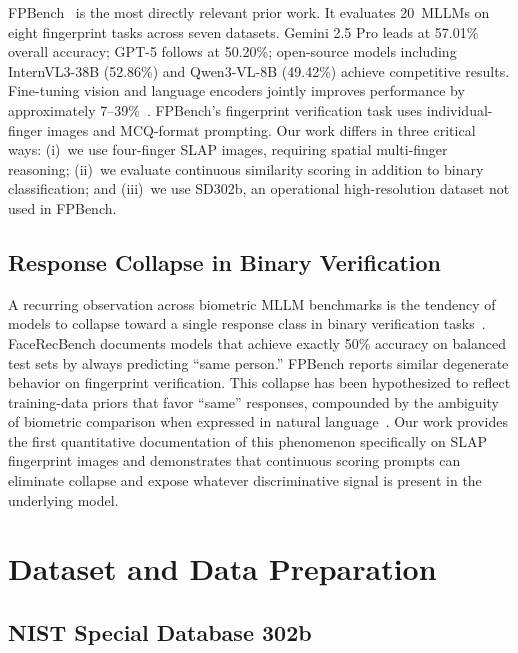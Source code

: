 \documentclass[journal]{IEEEtran}
\begin{document}
FPBench~\cite{fpbench2025} is the most directly relevant prior work.
It evaluates 20~MLLMs on eight fingerprint tasks across seven datasets.
Gemini 2.5 Pro leads at 57.01\% overall accuracy; GPT-5 follows at 50.20\%;
open-source models including InternVL3-38B (52.86\%) and Qwen3-VL-8B
(49.42\%) achieve competitive results.
Fine-tuning vision and language encoders jointly improves performance by
approximately 7--39\%~\cite{fpbench2025}.
FPBench's fingerprint verification task uses individual-finger images and
MCQ-format prompting.
Our work differs in three critical ways: (i)~we use four-finger SLAP images,
requiring spatial multi-finger reasoning; (ii)~we evaluate continuous
similarity scoring in addition to binary classification; and
(iii)~we use SD302b, an operational high-resolution dataset not used in
FPBench.

\subsection{Response Collapse in Binary Verification}

A recurring observation across biometric MLLM benchmarks is the tendency
of models to collapse toward a single response class in binary
verification tasks~\cite{facerecbench2025,fpbench2025}.
FaceRecBench documents models that achieve exactly 50\% accuracy on
balanced test sets by always predicting ``same person.''
FPBench reports similar degenerate behavior on fingerprint verification.
This collapse has been hypothesized to reflect training-data priors that
favor ``same'' responses, compounded by the ambiguity of biometric
comparison when expressed in natural language~\cite{facerecbench2025,fpbench2025}.
Our work provides the first quantitative documentation of this phenomenon
specifically on SLAP fingerprint images and demonstrates that continuous
scoring prompts can eliminate collapse and expose whatever discriminative
signal is present in the underlying model.

\section{Dataset and Data Preparation}
\label{sec:dataset}

\subsection{NIST Special Database 302b}
\end{document}
